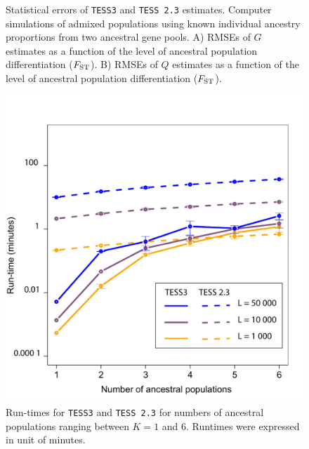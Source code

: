\begin{figure}[h!]
\begin {minipage}{0.49\textwidth}
\end{minipage}
\caption{Statistical errors of {\tt TESS3} and {\tt TESS 2.3} estimates. Computer simulations of admixed populations using known individual ancestry proportions from two ancestral gene pools. A) RMSEs of $G$ estimates as a function of the level of ancestral population differentiation ($F_{\rm ST}$). B) RMSEs of $Q$ estimates as a function of the level of ancestral population differentiation ($F_{\rm ST}$).}
\end{figure}    

\clearpage
\newpage



\begin{figure}[h!]
  \centering

\includegraphics[width=\linewidth]{FinalGraphs/runtimes.pdf}
\caption{ Run-times for {\tt TESS3} and {\tt TESS 2.3} for numbers of ancestral populations ranging between $K = 1$ and $6$. Runtimes were expressed in unit of minutes. }
\end{figure}

\clearpage
\newpage

